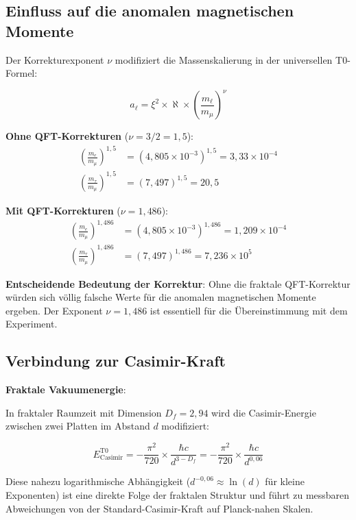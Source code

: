 \documentclass[12pt,a4paper]{article}
\newcommand{\xipar}{\xi}
\newcommand{\nulep}{\nu}
\begin{document}
\subsection{Einfluss auf die anomalen magnetischen Momente}

Der Korrekturexponent $\nulep$ modifiziert die Massenskalierung in der universellen T0-Formel:

\begin{equation}
	a_\ell = \xipar^2 \times \aleph \times \left(\frac{m_\ell}{m_\mu}\right)^\nulep
\end{equation}

\textbf{Ohne QFT-Korrekturen} ($\nulep = 3/2 = 1{,}5$):
\begin{align}
	\left(\frac{m_e}{m_\mu}\right)^{1{,}5} &= (4{,}805 \times 10^{-3})^{1{,}5} = 3{,}33 \times 10^{-4} \\
	\left(\frac{m_\tau}{m_\mu}\right)^{1{,}5} &= (7{,}497)^{1{,}5} = 20{,}5
\end{align}

\textbf{Mit QFT-Korrekturen} ($\nulep = 1{,}486$):
\begin{align}
	\left(\frac{m_e}{m_\mu}\right)^{1{,}486} &= (4{,}805 \times 10^{-3})^{1{,}486} = 1{,}209 \times 10^{-4} \\
	\left(\frac{m_\tau}{m_\mu}\right)^{1{,}486} &= (7{,}497)^{1{,}486} = 7{,}236 \times 10^5
\end{align}

\textbf{Entscheidende Bedeutung der Korrektur}: Ohne die fraktale QFT-Korrektur würden sich völlig falsche Werte für die anomalen magnetischen Momente ergeben. Der Exponent $\nulep = 1{,}486$ ist essentiell für die Übereinstimmung mit dem Experiment.

\subsection{Verbindung zur Casimir-Kraft}

\textbf{Fraktale Vakuumenergie}:

In fraktaler Raumzeit mit Dimension $D_f = 2{,}94$ wird die Casimir-Energie zwischen zwei Platten im Abstand $d$ modifiziert:

\begin{equation}
	E_{\text{Casimir}}^{\text{T0}} = -\frac{\pi^2}{720} \times \frac{\hbar c}{d^{3-D_f}} = -\frac{\pi^2}{720} \times \frac{\hbar c}{d^{0{,}06}}
\end{equation}

Diese nahezu logarithmische Abhängigkeit ($d^{-0{,}06} \approx \ln(d)$ für kleine Exponenten) ist eine direkte Folge der fraktalen Struktur und führt zu messbaren Abweichungen von der Standard-Casimir-Kraft auf Planck-nahen Skalen.
\end{document}
